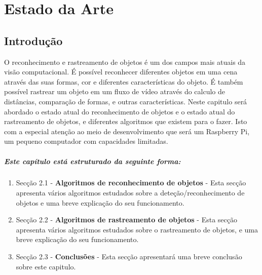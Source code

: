 \chapter{Estado da Arte}
\label{chap:estado-da-arte}

\section{Introdução}
\label{chap2:sec:intro}

O reconhecimento e rastreamento de objetos é um dos campos mais atuais da visão computacional.
\newline É possível reconhecer diferentes objetos em uma cena através das suas formas, cor e diferentes características do objeto.
É também possível rastrear um objeto em um fluxo de vídeo através do calculo de distâncias, comparação de formas, e outras características.
\newline Neste capitulo será abordado o estado atual do reconhecimento de objetos e o estado atual do rastreamento de objetos, e diferentes algoritmos que existem para o fazer. Isto com a especial atenção ao meio de desenvolvimento que será um Raspberry Pi, um pequeno computador com capacidades limitadas.
\paragraph{Este capítulo está estruturado da seguinte forma:}
\begin{enumerate}
  \item Secção 2.1 - \textbf{Algoritmos de reconhecimento de objetos} - Esta secção apresenta vários algoritmos estudados sobre a deteção/reconhecimento de objetos e uma breve explicação do seu funcionamento. 
  \item Secção 2.2 - \textbf{Algoritmos de rastreamento de objetos} - Esta secção apresenta vários algoritmos estudados sobre o rastreamento de objetos, e uma breve explicação do seu funcionamento.
  \item Secção 2.3 - \textbf{Conclusões} - Esta secção apresentará uma breve conclusão sobre este capitulo.
\end{enumerate}

